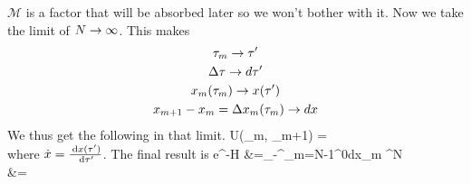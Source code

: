 \documentclass[12pt,onecolumn]{revtex4-2}
\begin{document}
\eeq
\(\mathcal{M}\) is a factor that will be absorbed later so we won't bother with it. Now we take the limit of \(N \rightarrow \infty\). This makes
\begin{gather}
\tau_m \rightarrow \tau^\prime\\
\Delta \tau \rightarrow d\tau^\prime\\
x_m(\tau_m) \rightarrow x(\tau^\prime)\\
x_{m+1} - x_m = \Delta x_m(\tau_m) \rightarrow dx
\end{gather}
We thus get the following in that limit.
\beq
{} U(\tau_m, \tau_{m+1}) = \\
\eeq
where \(\dot x = \frac{\:\mathrm{d}x(\tau^\prime)}{\:\mathrm{d}\tau^\prime}\). The final result is
\beq
\bra{2\pi} e^{-\fr{\tau}{\hbar}H}  &=\int_{-\infty}^\infty \prod_{m=N-1}^{0}dx_m ^N \\
					  &=\int{}
\eeq
\end{document}
